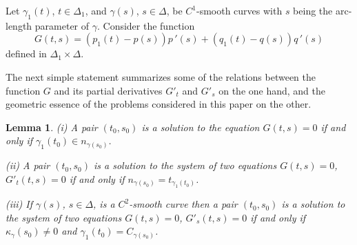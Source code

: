 \documentclass[10pt,a4paper]{amsart}
\newtheorem{lemma}[thm]{Lemma}
\def\g{\gamma}
\begin{document}
Let $\g_1(t)$, $t \in \Delta_1$, and $\g(s)$, $s \in \Delta$, be $C^1$-smooth curves
with  $s$ being the arc-length parameter of  $\g$.  Consider the function
\begin{equation}\label{G}
G(t,s)=(p_1(t)-p(s))p\,'(s)+(q_1(t)-q(s))q\,'(s)
\end{equation}
defined in $\Delta_1 \times \Delta$.

The next simple statement summarizes some of the relations between the function $G$ and its partial derivatives
 $G'_t$ and $G'_s$ on the one hand, and the geometric essence of the problems considered in this paper on the other.

\begin{lemma}\label{l1}
(i) A pair $(t_0, s_0)$ is a solution to the equation $G(t,s)=0$ if and only if $\g_1(t_0) \in n_{\g(s_0)}$.

(ii) A pair $(t_0, s_0)$ is a solution to the system of two equations $G(t,s)=0$,
$G'_t(t,s)=0$ if and only if
$n_{\g(s_0)} = t_{\g_1(t_0)}$.

(iii)  If $\g(s)$, $s \in \Delta$, is a $C^2$-smooth curve then a pair $(t_0, s_0)$ is a solution to the system of two equations $G(t,s)=0$,
$G'_s(t,s)=0$ if and only if $\kappa_{\g}(s_0) \neq 0$ and $\g_1(t_0) = C_{\g(s_0)}$.

\end{lemma}
\end{document}
